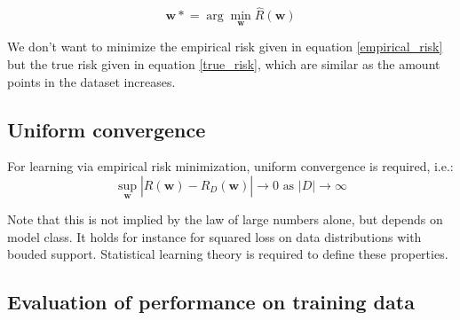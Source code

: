 \documentclass[a4paper,10pt,twoside]{article}
\begin{document}
\begin{equation}
    \label{true_risk}
    \mathbf{w*}=\arg\min_{\mathbf{w}}\hat{R}(\mathbf{w})
\end{equation}

We don't want to minimize the empirical risk given in equation \ref{empirical_risk} but the true risk given in equation \ref{true_risk}, which are similar as the amount points in the dataset increases.

\subsection{Uniform convergence}

For learning via empirical risk minimization, uniform convergence is required, i.e.:
\begin{equation*}
    \sup_{\mathbf{w}}|R(\mathbf{w})-\hat{R}_D(\mathbf{w})|\rightarrow 0 \text{ as }|D|\rightarrow\infty
\end{equation*}

Note that this is not implied by the law of large numbers alone, but depends on model class. It holds for instance for squared loss on data distributions with bouded support. Statistical learning theory is required to define these properties.

\subsection{Evaluation of performance on training data}
\end{document}
